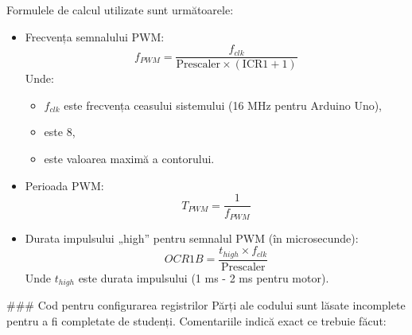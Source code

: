 \documentclass{report}
\begin{document}
Formulele de calcul utilizate sunt următoarele:
\begin{itemize}
    \item Frecvența semnalului PWM: 
    \[
    f_{PWM} = \frac{f_{clk}}{\text{Prescaler} \times (\text{ICR1} + 1)}
    \]
    Unde:
    \begin{itemize}
        \item $f_{clk}$ este frecvența ceasului sistemului (16 MHz pentru Arduino Uno),
        \item {} este 8,
        \item {} este valoarea maximă a contorului.
    \end{itemize}
    \item Perioada PWM: 
    \[
    T_{PWM} = \frac{1}{f_{PWM}}
    \]
    \item Durata impulsului „high” pentru semnalul PWM (în microsecunde): 
    \[
    OCR1B = \frac{t_{high} \times f_{clk}}{\text{Prescaler}}
    \]
    Unde $t_{high}$ este durata impulsului (1 ms - 2 ms pentru motor).
\end{itemize}
\newpage
\vspace*{1cm}
### Cod pentru configurarea registrilor
Părți ale codului sunt lăsate incomplete pentru a fi completate de studenți. Comentariile indică exact ce trebuie făcut:
\end{document}
